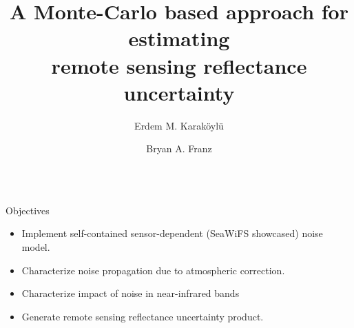 \documentclass[final]{beamer}
\title{A Monte-Carlo based approach for estimating \\remote sensing reflectance uncertainty} %
\author{Erdem M. Karak\"{o}yl\"{u} \and Bryan A. Franz} %
\institute{NASA Goddard Space Flight Center, Greenbelt, MD, 20771} %
\newlength{\sepwid}
\newlength{\onecolwid}
\begin{document}

\setlength\belowdisplayshortskip{2ex} %

\begin{frame}[t] %

\begin{columns}[t] %


\begin{column}{\onecolwid} %


\begin{alertblock}{Objectives}

\begin{itemize}
\item Implement self-contained sensor-dependent (SeaWiFS showcased) noise model.
\item Characterize noise propagation due to atmospheric correction.
\item Characterize impact of noise in near-infrared bands
\item Generate remote sensing reflectance uncertainty product.
\end{itemize}

\end{alertblock}



\end{column}
\end{columns}
\end{frame}
\end{document}
